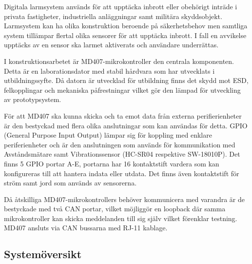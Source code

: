 \documentclass{article}
\begin{document}
Digitala larmsystem används för att upptäcka inbrott eller obehörigt inträde i privata fastigheter, industriella anläggningar samt militära skyddsobjekt. Larmsystem kan ha olika konstruktion beroende på säkerhetsbehov men samtliga system tillämpar flertal olika sensorer för att upptäcka inbrott. I fall en avvikelse upptäcks av en sensor ska larmet aktiverats och användare underrättas.

I konstruktionsarbetet är MD407-mikrokontroller den centrala komponenten. Detta är en laborationsdator med stabil hårdvara som har utvecklats i utbildningssyfte. Då datorn är utvecklad för utbildning finns det skydd mot ESD, felkopplingar och mekaniska påfrestningar vilket gör den lämpad för utveckling av prototypsystem.

För att MD407 ska kunna skicka och ta emot data från externa perifierienheter är den bestyckad med flera olika anslutningar som kan användas för detta. GPIO (General Purpose Input Output) lämpar sig för koppling med enklare periferienheter och är den anslutningen som används för kommunikation med Avståndsmätare samt Vibrationssensor (HC-SR04 respektive SW-18010P). Det finns 5 GPIO portar A-E, portarna har 16 kontaktstift vardera som kan konfigureras till att hantera indata eller utdata. Det finns även kontaktstift för ström samt jord som används av sensorerna.

Då åtskilliga MD407-mikrokontrollers behöver kommunicera med varandra är de bestyckade med två CAN portar, vilket möjliggör en loopback där samma mikrokontroller kan skicka meddelanden till sig själv vilket förenklar testning. MD407 ansluts via CAN bussarna med RJ-11 kablage.



\subsection{Systemöversikt}
\end{document}
